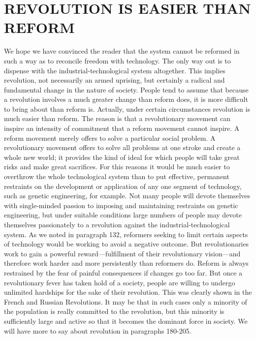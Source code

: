 \chapter{REVOLUTION IS EASIER THAN REFORM}

 We hope we have convinced the reader that the system cannot be reformed in such a way as to reconcile freedom with technology. The only way out is to dispense with the industrial-technological system altogether. This implies revolution, not necessarily an armed uprising, but certainly a radical and fundamental change in the nature of society.
 People tend to assume that because a revolution involves a much greater change than reform does, it is more difficult to bring about than reform is. Actually, under certain circumstances revolution is much easier than reform. The reason is that a revolutionary movement can inspire an intensity of commitment that a reform movement cannot inspire. A reform movement merely offers to solve a particular social problem. A revolutionary movement offers to solve all problems at one stroke and create a whole new world; it provides the kind of ideal for which people will take great risks and make great sacrifices. For this reasons it would be much easier to overthrow the whole technological system than to put effective, permanent restraints on the development or application of any one segment of technology, such as genetic engineering, for example. Not many people will devote themselves with single-minded passion to imposing and maintaining restraints on genetic engineering, but under suitable conditions large numbers of people may devote themselves passionately to a revolution against the industrial-technological system. As we noted in paragraph 132, reformers seeking to limit certain aspects of technology would be working to avoid a negative outcome. But revolutionaries work to gain a powerful reward—fulfillment of their revolutionary vision—and therefore work harder and more persistently than reformers do.
 Reform is always restrained by the fear of painful consequences if changes go too far. But once a revolutionary fever has taken hold of a society, people are willing to undergo unlimited hardships for the sake of their revolution. This was clearly shown in the French and Russian Revolutions. It may be that in such cases only a minority of the population is really committed to the revolution, but this minority is sufficiently large and active so that it becomes the dominant force in society. We will have more to say about revolution in paragraphs 180-205.

